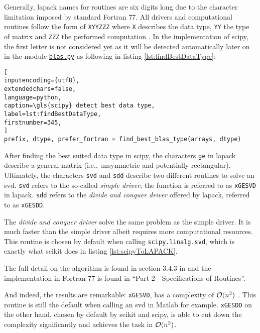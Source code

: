 Generally, \acrshort{lapack} names for routines are six digits long due to the character limitation imposed by standard Fortran 77.
All drivers and computational routines follow the form of \texttt{XYYZZZ} where \texttt{X} describes the data type, \texttt{YY} the type of matrix and \texttt{ZZZ} the performed computation \cite{anderson1999lapack}.
In the implementation of \gls{scipy}, the first letter is not considered yet as it will be detected automatically later on in the module \href{\scipyvIxVIIxII{blas}}{\texttt{blas.py}} as following in listing \ref{lst:findBestDataType}:

\begin{lstlisting}[
inputencoding={utf8}, 
extendedchars=false, 
language=python, 
caption=\gls{scipy} detect best data type, 
label=lst:findBestDataType,
firstnumber=345,
]
prefix, dtype, prefer_fortran = find_best_blas_type(arrays, dtype)
\end{lstlisting}

After finding the best suited data type in \gls{scipy}, the characters \texttt{ge} in \acrshort{lapack} describe a general matrix (i.e., unsymmetric and potentially rectangular).
Ultimately, the characters \texttt{svd} and \texttt{sdd} describe two different routines to solve an \gls{svd}.
\texttt{svd} refers to the so-called \emph{simple driver}, the function is referred to as \texttt{xGESVD} in \acrshort{lapack}.
\texttt{sdd} refers to the \emph{divide and conquer driver} offered by \acrshort{lapack}, referred to as \texttt{xGESDD}.
\medskip

The \emph{divide and conquer driver} solve the same problem as the simple driver.
It is much faster than the simple driver albeit requires more computational resources.
This routine is chosen by default when calling \texttt{scipy.linalg.svd}, which is exactly what \gls{scikit} does in listing \ref{lst:scipyToLAPACK}.

The full detail on the algorithm is found in section 3.4.3 in  \cite{anderson1999lapack} and the implementation in Fortran 77 is found in ``Part 2 - Specifications of Routines''.
\bigskip

And indeed, the results are remarkable: \texttt{xGESVD}, has a complexity of $\mathcal{O}(n^3)$ \cite{wright2001large}.
This routine is still the default when calling an \gls{svd} in Matlab for example.
\texttt{xGESDD} on the other hand, chosen by default by scikit and \gls{scipy}, is able to cut down the complexity significantly and achieves the task in $\mathcal{O}(n^2)$\cite{anderson1999lapack}.

